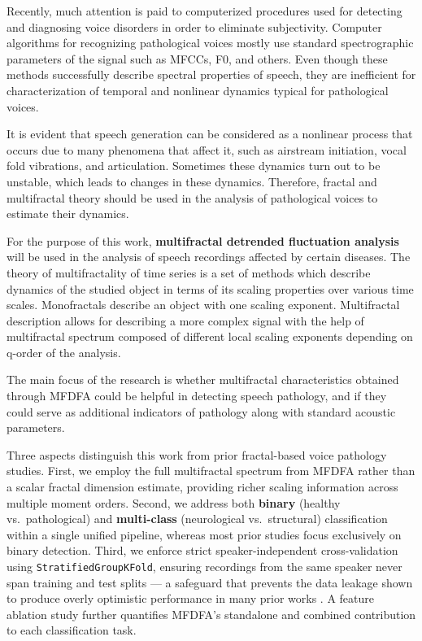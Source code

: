 \documentclass[conference]{IEEEtran}
\begin{document}
Recently, much attention is paid to computerized procedures used for detecting and diagnosing voice disorders in order to eliminate subjectivity. Computer algorithms for recognizing pathological voices mostly use standard spectrographic parameters of the signal such as MFCCs, F0, and others. Even though these methods successfully describe spectral properties of speech, they are inefficient for characterization of temporal and nonlinear dynamics typical for pathological voices.

It is evident that speech generation can be considered as a nonlinear process that occurs due to many phenomena that affect it, such as airstream initiation, vocal fold vibrations, and articulation. Sometimes these dynamics turn out to be unstable, which leads to changes in these dynamics. Therefore, fractal and multifractal theory should be used in the analysis of pathological voices to estimate their dynamics.

For the purpose of this work, \textbf{multifractal detrended fluctuation analysis} will be used in the analysis of speech recordings affected by certain diseases. The theory of multifractality of time series is a set of methods which describe dynamics of the studied object in terms of its scaling properties over various time scales. Monofractals describe an object with one scaling exponent. Multifractal description allows for describing a more complex signal with the help of multifractal spectrum composed of different local scaling exponents depending on q-order of the analysis.

The main focus of the research is whether multifractal characteristics obtained through MFDFA could be helpful in detecting speech pathology, and if they could serve as additional indicators of pathology along with standard acoustic parameters.

  Three aspects distinguish this work from prior fractal-based voice pathology studies. First, we employ the full multifractal spectrum from MFDFA rather than a scalar fractal dimension estimate, providing richer scaling information across multiple moment orders. Second, we address both \textbf{binary} (healthy vs.\ pathological) and \textbf{multi-class} (neurological vs.\ structural) classification within a single unified pipeline, whereas most prior studies focus exclusively on binary detection. Third, we enforce strict speaker-independent cross-validation using \texttt{StratifiedGroupKFold}, ensuring recordings from the same speaker never span training and test splits — a safeguard that prevents the data leakage shown to produce overly optimistic performance in many prior works \cite{saenzlechon2006}. A feature ablation study further quantifies MFDFA's standalone and combined contribution to each classification task.
\end{document}
